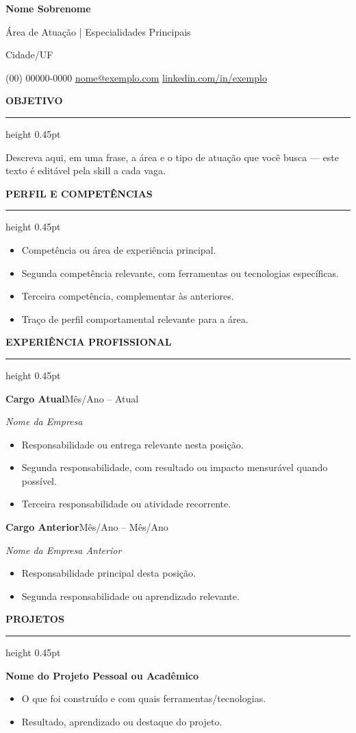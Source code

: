 \documentclass[9pt,a4paper]{extarticle}
\newcommand{\sectiontitle}[1]{%
  \vspace{4.6pt}%
  {\color{accent}\bfseries\normalsize\MakeUppercase{#1}}\par\vspace{1.6pt}%
  {\color{rulegray}\hrule height 0.45pt}\vspace{2.7pt}%
}
\newcommand{\role}[3]{%
  \vspace{1.4pt}%
  \textbf{#1}\hfill {\color{muted}\small #3}\par
  \textit{#2}\vspace{0pt}
}
\newcommand{\project}[1]{\vspace{1.2pt}\textbf{#1}\vspace{-1pt}}
\newcommand{\contactsep}{\hspace{4pt}{\color{rulegray}|}\hspace{4pt}}
\begin{document}
\RaggedRight

{\Large\bfseries Nome Sobrenome}\par\vspace{1.2pt}
{\color{muted}Área de Atuação | Especialidades Principais}\par\vspace{2.3pt}
{\color{muted}Cidade/UF}\par\vspace{0.5pt}
{\small
(00) 00000-0000 \contactsep
\href{mailto:nome@exemplo.com}{nome@exemplo.com} \contactsep
\href{https://www.linkedin.com/in/exemplo}{linkedin.com/in/exemplo}
}


\sectiontitle{Objetivo}
Descreva aqui, em uma frase, a área e o tipo de atuação que você busca — este texto é editável pela skill a cada vaga.

\sectiontitle{Perfil e Competências}
\begin{itemize}
  \item Competência ou área de experiência principal.
  \item Segunda competência relevante, com ferramentas ou tecnologias específicas.
  \item Terceira competência, complementar às anteriores.
  \item Traço de perfil comportamental relevante para a área.
\end{itemize}

\sectiontitle{Experiência Profissional}
\role{Cargo Atual}{Nome da Empresa}{Mês/Ano -- Atual}
\begin{itemize}
  \item Responsabilidade ou entrega relevante nesta posição.
  \item Segunda responsabilidade, com resultado ou impacto mensurável quando possível.
  \item Terceira responsabilidade ou atividade recorrente.
\end{itemize}

\role{Cargo Anterior}{Nome da Empresa Anterior}{Mês/Ano -- Mês/Ano}
\begin{itemize}
  \item Responsabilidade principal desta posição.
  \item Segunda responsabilidade ou aprendizado relevante.
\end{itemize}

\sectiontitle{Projetos}
\project{Nome do Projeto Pessoal ou Acadêmico}
\begin{itemize}
  \item O que foi construído e com quais ferramentas/tecnologias.
  \item Resultado, aprendizado ou destaque do projeto.
\end{itemize}
\end{document}
